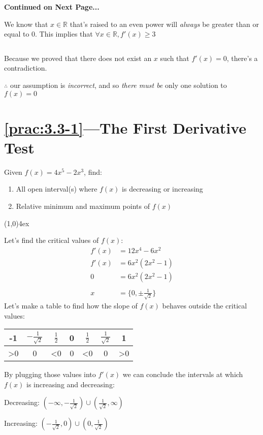 \documentclass{MathNotes}
\newcommand{\br}{
\begin{center}
\line(1,0){4ex}
\end{center}}
\newcommand{\continued}{
\mbox{}
\vfill
\textbf{Continued on Next Page...}\newpage
}
\newcommand{\bl}{
    \newline$ $\newline
}
\begin{document}
\continued
{}
We know that $x\in\mathbb{R}$ that's raised to an even power will 
\textit{always} be greater than or equal to 0. This implies that
$\forall x\in\mathbb{R},f'(x)\geq3$
\bl
Because we proved that there does not exist an $x$ such that $f'(x)=0$, there's
a contradiction.

$\therefore$ our assumption is \textit{incorrect}, and so \textit{there must be}
only one solution to $f(x)=0$


\section*{\ref{prac:3.3-1}---The First Derivative Test}\label{ans:3.3-1}
Given $\displaystyle f(x)=4x^5-2x^3$, find:
\begin{enumerate}
    \item All open interval(s) where $f(x)$ is decreasing or increasing
    \item Relative minimum and maximum points of $f(x)$
\end{enumerate}
\br
Let's find the critical values of $f(x)$:
\begin{align*}
    f'(x)&=12x^4-6x^2\\
    f'(x)&=6x^2(2x^2-1)\\
    0&=6x^2(2x^2-1)\\
    \\
    x&=\{0,\pm\frac{1}{\sqrt{2}}\}
\end{align*}
Let's make a table to find how the slope of $f(x)$ behaves outside the critical
values:
\begin{center}
    \begin{tabular}{c|c|c|c|c|c|c}
        -1 & $-\frac{1}{\sqrt{2}}$ & $\frac{1}{2}$ & 0 & $\frac{1}{2}$ & $\frac{1}{\sqrt{2}}$ & 1\\
        \hline
        >0&0&<0&0&<0&0&>0
\end{tabular}
\end{center}
By plugging those values into $f'(x)$ we can conclude the intervals at which
$f(x)$ is increasing and decreasing:
\begin{multicols}{2}
Decreasing: $(-\infty,-\frac{1}{\sqrt{2}})\cup(\frac{1}{\sqrt{2}},\infty)$

Increasing: $(-\frac{1}{\sqrt{2}},0)\cup(0,\frac{1}{\sqrt{2}})$
\end{multicols}
\end{document}

